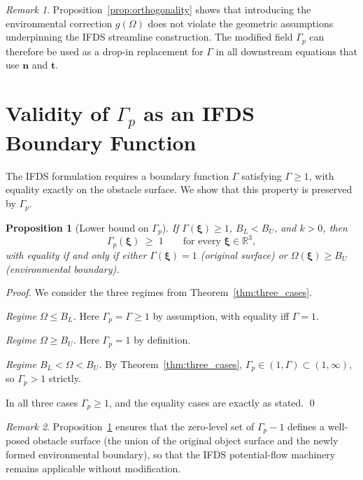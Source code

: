 \documentclass[11pt]{article}
\newtheorem{proposition}[theorem]{Proposition}
\theoremstyle{remark}
\newtheorem*{remark}{Remark}
\newcommand{\R}{\mathbb{R}}
\newcommand{\G}{\Gamma}
\newcommand{\Gp}{\Gamma_p}
\newcommand{\Om}{\Omega}
\newcommand{\xib}{\bm{\xi}}
\newcommand{\nb}{\mathbf{n}}
\newcommand{\tb}{\mathbf{t}}
\begin{document}
\begin{remark}
Proposition~\ref{prop:orthogonality} shows that introducing the environmental correction $g(\Om)$ does not violate the geometric assumptions underpinning the IFDS streamline construction. The modified field $\Gp$ can therefore be used as a drop-in replacement for $\G$ in all downstream equations that use $\nb$ and $\tb$.
\end{remark}

\bigskip

\section{Validity of $\Gp$ as an IFDS Boundary Function}

The IFDS formulation requires a boundary function $\G$ satisfying $\G\ge 1$, with equality exactly on the obstacle surface. We show that this property is preserved by $\Gp$.

\begin{proposition}[Lower bound on $\Gp$]
\label{prop:lower_bound}
If $\G(\xib)\ge 1$, $B_L<B_U$, and $k>0$, then
\[
    \Gp(\xib) \;\ge\; 1 \qquad\text{for every }\xib\in\R^3,
\]
with equality if and only if either $\G(\xib)=1$ (original surface) or $\Om(\xib)\ge B_U$ (environmental boundary).
\end{proposition}

\begin{proof}
We consider the three regimes from Theorem~\ref{thm:three_cases}.

\smallskip
\noindent\emph{Regime $\Om\le B_L$.} Here $\Gp=\G\ge 1$ by assumption, with equality iff $\G=1$.

\smallskip
\noindent\emph{Regime $\Om\ge B_U$.} Here $\Gp=1$ by definition.

\smallskip
\noindent\emph{Regime $B_L<\Om<B_U$.} By Theorem~\ref{thm:three_cases}, $\Gp\in(1,\G)\subset(1,\infty)$, so $\Gp>1$ strictly.

\smallskip
In all three cases $\Gp\ge 1$, and the equality cases are exactly as stated. \qed
\end{proof}

\begin{remark}
Proposition~\ref{prop:lower_bound} ensures that the zero-level set of $\Gp-1$ defines a well-posed obstacle surface (the union of the original object surface and the newly formed environmental boundary), so that the IFDS potential-flow machinery remains applicable without modification.
\end{remark}
\end{document}
